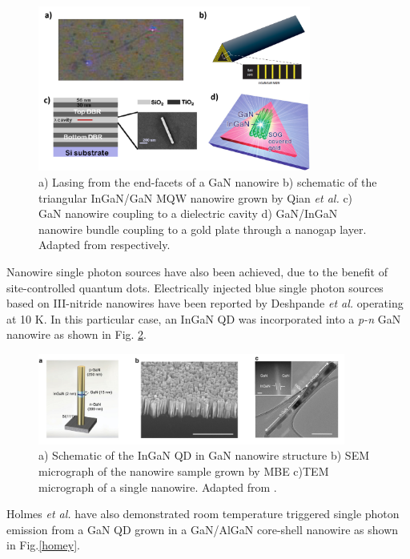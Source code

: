 \begin{figure}[h]
	\centering
	\includegraphics[width=0.8\textwidth]{Figs/Ch1/nw_lasers.png}
	\caption {a) Lasing from the end-facets of a GaN nanowire b) schematic of the triangular InGaN/GaN MQW nanowire grown by Qian {\it et al.} c) GaN nanowire coupling to a dielectric cavity d) GaN/InGaN nanowire bundle coupling to a gold plate through a nanogap layer. Adapted from \cite{Johnson2002,Qian2008,Das2011,Wu2011} respectively.} 
	\label{1.20}
\end{figure}
\FloatBarrier 

Nanowire single photon sources have also been achieved, due to  the benefit of site-controlled quantum dots. Electrically injected blue single photon sources based on III-nitride nanowires have been reported by Deshpande {\it et al.} operating at 10 K. In this particular case, an InGaN QD was incorporated into a {\it p-n} GaN nanowire as shown in Fig. \ref{elec}.

\begin{figure}[h]
	\centering
	\includegraphics[width=0.9\textwidth]{Figs/Ch1/elect_SPS.png}
	\caption {a) Schematic of the InGaN QD in GaN nanowire structure b) SEM micrograph of the nanowire sample grown by MBE c)TEM micrograph of a single nanowire. Adapted from \cite{Deshpande2013b}.}
	\label{elec}
\end{figure}
\FloatBarrier 

Holmes \textit{et al.} have also demonstrated room temperature triggered single photon emission from a GaN QD grown in a GaN/AlGaN core-shell nanowire as shown in Fig.\ref{homey}.

